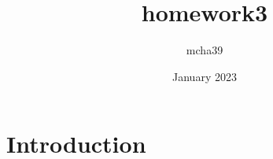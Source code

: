 \documentclass{article}
\title{homework3}
\author{mcha39 }
\date{January 2023}
\begin{document}
\maketitle

\section{Introduction}
\end{document}
